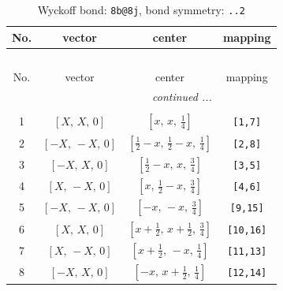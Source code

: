 \documentclass[fleqn,8pt]{jsarticle}
\begin{document}
\begin{longtable}{cccc}
\caption{Wyckoff bond: {\tt 8b@8j}, bond symmetry: {\tt ..2}}
 \\
 \hline \hline
No. & vector & center & mapping \\ \hline \endfirsthead

\multicolumn{3}{l}{\tablename\ \thetable{}} \\
 \hline \hline
No. & vector & center & mapping \\ \hline \endhead

 \hline \hline
\multicolumn{3}{r}{\footnotesize\it continued ...} \\ \endfoot

 \hline \hline
\multicolumn{3}{r}{} \\ \endlastfoot

1 & $\left[ X,\, X,\, 0 \right]$ & $\left[ x,\, x,\, \frac{1}{4} \right]$ & {\tt [1,7]} \\ \hline
2 & $\left[ - X,\, - X,\, 0 \right]$ & $\left[ \frac{1}{2} - x,\, \frac{1}{2} - x,\, \frac{1}{4} \right]$ & {\tt [2,8]} \\ \hline
3 & $\left[ - X,\, X,\, 0 \right]$ & $\left[ \frac{1}{2} - x,\, x,\, \frac{3}{4} \right]$ & {\tt [3,5]} \\ \hline
4 & $\left[ X,\, - X,\, 0 \right]$ & $\left[ x,\, \frac{1}{2} - x,\, \frac{3}{4} \right]$ & {\tt [4,6]} \\ \hline
5 & $\left[ - X,\, - X,\, 0 \right]$ & $\left[ - x,\, - x,\, \frac{3}{4} \right]$ & {\tt [9,15]} \\ \hline
6 & $\left[ X,\, X,\, 0 \right]$ & $\left[ x + \frac{1}{2},\, x + \frac{1}{2},\, \frac{3}{4} \right]$ & {\tt [10,16]} \\ \hline
7 & $\left[ X,\, - X,\, 0 \right]$ & $\left[ x + \frac{1}{2},\, - x,\, \frac{1}{4} \right]$ & {\tt [11,13]} \\ \hline
8 & $\left[ - X,\, X,\, 0 \right]$ & $\left[ - x,\, x + \frac{1}{2},\, \frac{1}{4} \right]$ & {\tt [12,14]} \\
\end{longtable}
\renewcommand{\arraystretch}{1.2}
\end{document}
